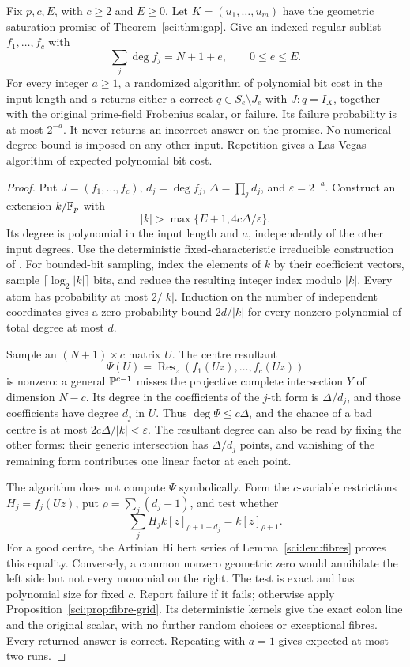 \begin{proposition}
\label{sci:prop:random-designated}
Fix \(p,c,E\), with \(c\geq2\) and \(E\geq0\). Let
\(K=(u_1,\ldots,u_m)\) have the geometric saturation promise of
Theorem~\ref{sci:thm:gap}. Give an indexed regular sublist
\(f_1,\ldots,f_c\) with
\[
 \sum_j\deg f_j=N+1+e,\qquad 0\leq e\leq E.
\]
For every integer \(a\geq1\), a randomized algorithm of polynomial
bit cost in the input length and \(a\) returns either a correct
\(q\in S_e\setminus J_e\) with \(J:q=I_X\), together with the
original prime-field Frobenius scalar, or failure. Its failure
probability is at most \(2^{-a}\). It never returns an incorrect
answer on the promise. No numerical-degree bound is imposed on any
other input. Repetition gives a Las Vegas algorithm of expected
polynomial bit cost.
\end{proposition}
\begin{proof}
Put \(J=(f_1,\ldots,f_c)\), \(d_j=\deg f_j\),
\(\Delta=\prod_jd_j\), and \(\varepsilon=2^{-a}\).
Construct an extension \(k/\mathbb F_p\) with
\[
 |k|>\max\{E+1,4c\Delta/\varepsilon\}.
\]
Its degree is polynomial in the input length and \(a\), independently
of the other input degrees. Use the deterministic fixed-characteristic
irreducible construction of \citet[Theorem~3.2, author manuscript
p.~3]{sci-shoup}. For bounded-bit sampling, index the elements of \(k\)
by their coefficient vectors, sample \(\lceil\log_2|k|\rceil\) bits,
and reduce the resulting integer index modulo \(|k|\). Every atom has
probability at most \(2/|k|\). Induction on the number of independent
coordinates gives a zero-probability bound \(2d/|k|\) for every
nonzero polynomial of total degree at most \(d\).

Sample an \((N+1)\times c\) matrix \(U\). The centre resultant
\[
 \Psi(U)=\operatorname{Res}_z(f_1(Uz),\ldots,f_c(Uz))
\]
is nonzero: a general \(\mathbb P^{c-1}\) misses the projective complete
intersection \(Y\) of dimension \(N-c\). Its degree in the
coefficients of the \(j\)-th form is \(\Delta/d_j\), and those
coefficients have degree \(d_j\) in \(U\). Thus
\(\deg\Psi\leq c\Delta\), and the chance of a bad centre is at
most \(2c\Delta/|k|<\varepsilon\). The resultant degree can also be
read by fixing the other forms: their generic intersection has
\(\Delta/d_j\) points, and vanishing of the remaining form contributes
one linear factor at each point.

The algorithm does not compute \(\Psi\) symbolically. Form the
\(c\)-variable restrictions \(H_j=f_j(Uz)\), put
\(\rho=\sum_j(d_j-1)\), and test whether
\[
 \sum_j H_j k[z]_{\rho+1-d_j}=k[z]_{\rho+1}.
\]
For a good centre, the Artinian Hilbert series of
Lemma~\ref{sci:lem:fibres} proves this equality. Conversely, a common
nonzero geometric zero would annihilate the left side but not every
monomial on the right. The test is exact and has polynomial size for
fixed \(c\). Report failure if it fails; otherwise apply
Proposition~\ref{sci:prop:fibre-grid}. Its deterministic kernels give
the exact colon line and the original scalar, with no further random
choices or exceptional fibres. Every returned answer is correct.
Repeating with \(a=1\) gives expected at most two runs.
\end{proof}

